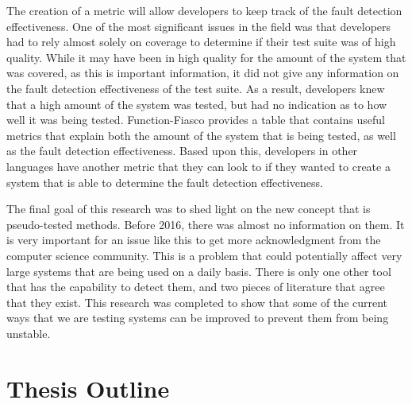 The creation of a metric will allow developers to keep track of the fault detection effectiveness. One of the most significant issues in the field was that developers had to rely almost solely on coverage to determine if their test suite was of high quality. While it may have been in high quality for the amount of the system that was covered, as this is important information, it did not give any information on the fault detection effectiveness of the test suite. As a result, developers knew that a high amount of the system was tested, but had no indication as to how well it was being tested. Function-Fiasco provides a table that contains useful metrics that explain both the amount of the system that is being tested, as well as the fault detection effectiveness. Based upon this, developers in other languages have another metric that they can look to if they wanted to create a system that is able to determine the fault detection effectiveness.

The final goal of this research was to shed light on the new concept that is pseudo-tested methods. Before 2016, there was almost no information on them. It is very important for an issue like this to get more acknowledgment from the computer science community. This is a problem that could potentially affect very large systems that are being used on a daily basis. There is only one other tool that has the capability to detect them, and two pieces of literature that agree that they exist. This research was completed to show that some of the current ways that we are testing systems can be improved to prevent them from being unstable.

\section{Thesis Outline}\label{sec:outline}

